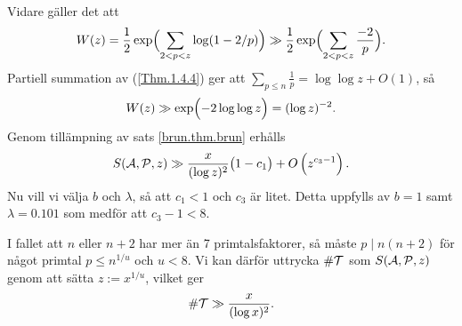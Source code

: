 Vidare gäller det att 
\begin{align*}
    W(z) = \frac{1}{2}\exp\Bigl(\sum_{2<p<z} \log(1-2/p) \Bigr) 
    \gg \frac{1}{2}\exp\Bigl(\sum_{2<p<z} \frac{-2}{p} \Bigr).
\end{align*}
Partiell summation av (\ref{Thm.1.4.4}) ger att $\sum_{p\leq n}\frac{1}{p} = \log\log z + O(1)$, så
\begin{align*}
    W(z) \gg \exp\Bigl(-2\log\log z\Bigr)
    = (\log z)^{-2}.
\end{align*}
Genom tillämpning av sats \ref{brun.thm.brun} erhålls
\begin{equation*}
    \S{A}{P}{z} \gg \frac{x}{(\log z)^2}\bigl(1 - c_1\bigr) + O\left(z^{c_3 - 1}\right).
\end{equation*}
Nu vill vi välja $b$ och $\lambda$, så att $c_1<1$ och $c_3$ är litet. 
Detta uppfylls av $b=1$ samt $\lambda=0.101$ som medför att $c_3-1<8$.


I fallet att $n$ eller $n+2$ har mer än 7 primtalsfaktorer,
så måste $p\mid n(n+2)$ för något primtal $p\leq n^{1/u}$ och $u<8$.
Vi kan därför uttrycka $\card\mathcal{T}$ som $\S{A}{P}{z}$ genom att sätta $z := x^{1/u}$, vilket ger
\begin{equation*}
    \card\mathcal{T} \gg \frac{x}{(\log x)^2}.
\end{equation*}






\begin{comment}

två funktioner $g_U$ och $g_L$ som uppfyller 
\begin{alignat*}{3}
    g_U(1)&=1,\quad \text{och}&\quad \mu(d)(g_U(d)-g_U(pd)) &\geq 0, \\
    g_L(1)&=1,\quad \text{och}&\quad \mu(d)(g_L(d)-g_L(pd)) &\leq 0,
\end{alignat*}






\end{comment}